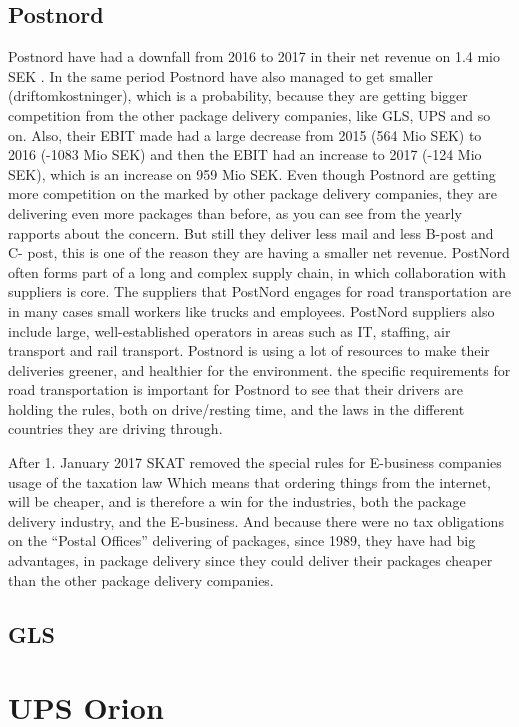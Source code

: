 \documentclass[12pt]{report}
\begin{document}
\subsection{Postnord}
Postnord have had a downfall from 2016 to 2017 in their net revenue on 1.4 mio SEK . 
In the same period Postnord have also managed to get smaller (driftomkostninger), which is a probability, because they are getting bigger competition from the other package delivery companies, like GLS, UPS and so on. 
Also, their EBIT made had a large decrease from 2015 (564 Mio SEK) to 2016 (-1083 Mio SEK)  and then the EBIT had an increase to 2017 (-124 Mio SEK), which is an increase on 959 Mio SEK.
Even though Postnord are getting more competition on the marked by other package delivery companies, they are delivering even more packages than before, as you can see from the yearly rapports about the concern. But still they deliver less mail and less B-post and C- post, this is one of the reason they are having a smaller net revenue. 
PostNord often forms part of a long and complex supply chain, in which collaboration with suppliers is core. The suppliers that PostNord engages for road transportation are in many cases small workers like trucks and employees. PostNord suppliers also include large, well-established operators in areas such as IT, staffing, air transport and rail transport. Postnord is using a lot of resources to make their deliveries greener, and healthier for the environment. the specific requirements for road transportation is important for Postnord to see that their drivers are holding the rules, both on drive/resting time, and the laws in the different countries they are driving through. 

After 1. January 2017 SKAT removed the special rules for E-business companies usage of the taxation law 
Which means that ordering things from the internet, will be cheaper, and is therefore a win for the industries, both the package delivery industry, and the E-business. And because there were no tax obligations on the “Postal Offices” delivering of packages, since 1989, they have had big advantages, in package delivery since they could deliver their packages cheaper than the other package delivery companies.   

\subsection{GLS}

\section{UPS Orion}
\end{document}
